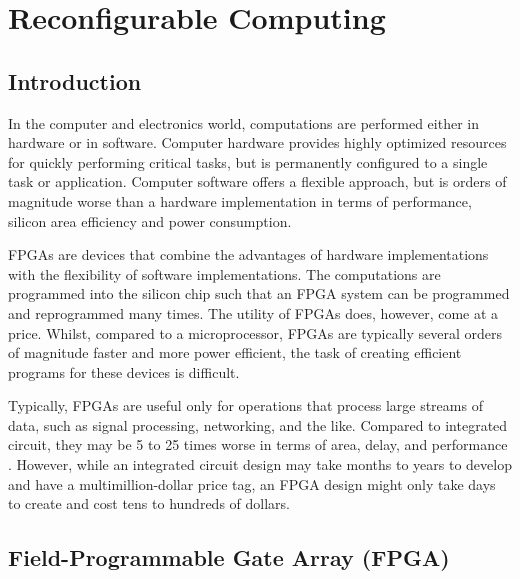 \chapter{Reconfigurable Computing}
\label{ch:reconfigurableComputing}

\section{Introduction}
\label{sec:rcIntroduction}
In the computer and electronics world, computations are performed either in 
hardware or in software. Computer hardware provides highly optimized resources
for quickly performing critical tasks, but is permanently configured to a 
single task or application. Computer software offers a flexible approach, but is
orders of magnitude worse than a hardware implementation in terms of 
performance, silicon area efficiency and power consumption.

FPGAs are devices that combine the advantages of hardware implementations with 
the flexibility of software implementations. The computations are programmed 
into the silicon chip such that an FPGA system can be programmed and 
reprogrammed many times. The utility of FPGAs does, however, come at a price. 
Whilst, compared to a microprocessor, FPGAs are typically several orders of 
magnitude faster and more power efficient, the task of creating efficient 
programs for these devices is difficult.

Typically, FPGAs are useful only for operations that process large streams of 
data, such as signal processing, networking, and the like. Compared to 
integrated circuit, they may be 5 to 25 times worse in terms of area, delay, and
performance \cite{Hauck:2007}. However, while an integrated circuit design may 
take months to years to develop and have a multimillion-dollar price tag, an 
FPGA design might only take days to create and cost tens to hundreds of dollars.

\section{Field-Programmable Gate Array (FPGA)}
\label{sec:FPGA}
